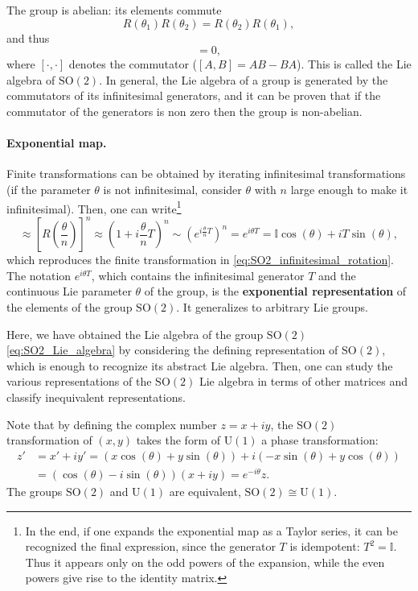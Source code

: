The group is abelian: its elements commute
\[
    R(\theta_1) R(\theta_2) = R(\theta_2) R(\theta_1),
\]
and thus
\begin{equation}
    [T, T] = 0,
    \label{eq:SO2_Lie_algebra}
\end{equation}
where $[\cdot,\cdot]$ denotes the commutator ($[A,B] = AB - BA$). This is called the Lie algebra of \(\mathrm{SO}(2)\). In general, the Lie algebra of a group is generated by the commutators of its infinitesimal generators, and it can be proven that if the commutator of the generators is non zero then the group is non-abelian.

\paragraph{Exponential map.}
Finite transformations can be obtained by iterating infinitesimal transformations (if the parameter $\theta$ is not infinitesimal, consider $\theta$ with $n$ large enough to make it infinitesimal). Then, one can write\footnote{In the end, if one expands the exponential map as a Taylor series, it can be recognized the final expression, since the generator \(T\) is idempotent: \(T^2 = \mathbb{I}\). Thus it appears only on the odd powers of the expansion, while the even powers give rise to the identity matrix.}
\begin{equation}
    [R(\theta)] \approx \left[R\left(\frac{\theta}{n}\right)\right]^n \approx (1 + i\frac{\theta}{n}T)^n \sim \left(e^{i \frac{\theta}{n} T}\right)^n = e^{i \theta T} = \mathbb{I} \cos(\theta) + i T \sin(\theta),
    \label{eq:SO2_exponential_map}
\end{equation}
which reproduces the finite transformation in \eqref{eq:SO2_infinitesimal_rotation}. The notation $e^{i \theta T}$, which contains the infinitesimal generator $T$ and the continuous Lie parameter $\theta$ of the group, is the \textbf{exponential representation} of the elements of the group \(\mathrm{SO}(2)\). It generalizes to arbitrary Lie groups.

Here, we have obtained the Lie algebra of the group \(\mathrm{SO}(2)\) \eqref{eq:SO2_Lie_algebra} by considering the defining representation of \(\mathrm{SO}(2)\), which is enough to recognize its abstract Lie algebra. Then, one can study the various representations of the \(\mathrm{SO}(2)\) Lie algebra in terms of other matrices and classify inequivalent representations.

Note that by defining the complex number $z = x + i y$, the \(\mathrm{SO}(2)\) transformation of $(x, y)$ takes the form of \(\mathrm{U}(1)\) a phase transformation:
\[
    \begin{aligned}
        z' & = x' + i y' = (x \cos(\theta) + y \sin(\theta)) + i (-x \sin(\theta) + y \cos(\theta)) \\
           & = (\cos(\theta) - i \sin(\theta))(x + i y) = e^{-i \theta} z.
    \end{aligned}
\]
The groups \(\mathrm{SO}(2)\) and \(\mathrm{U}(1)\) are equivalent, $\mathrm{SO}(2) \cong \mathrm{U}(1)$.

